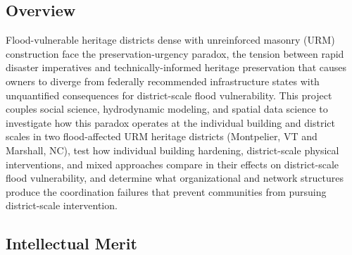 \documentclass[11pt]{article}
\begin{document}
\pagestyle{empty}

\subsection{Overview}
\vspace{-0.3cm}

Flood-vulnerable heritage districts dense with unreinforced masonry (URM) construction face the preservation-urgency paradox, the tension between rapid disaster imperatives and technically-informed heritage preservation that causes owners
to diverge from federally recommended infrastructure states with unquantified
consequences for district-scale flood vulnerability. This project couples
social science, hydrodynamic modeling, and spatial data science to investigate
how this paradox operates at the individual building and district scales in two
flood-affected URM heritage districts (Montpelier, VT and Marshall, NC),
test how individual building hardening, district-scale physical interventions,
and mixed approaches compare in their effects on district-scale flood vulnerability,
and determine what organizational and network structures produce the coordination
failures that prevent communities from pursuing district-scale intervention. 

\vspace{-0.5cm}

\subsection{Intellectual Merit}
\vspace{-0.3cm}
\end{document}
